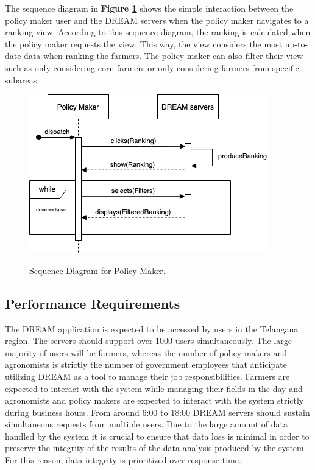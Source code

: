 \begin{flushleft}
The sequence diagram in \textbf{Figure \ref{fig:policySeqViewRank}} shows the simple interaction between the policy maker user and the DREAM servers when the policy maker navigates to a ranking view. According to this sequence diagram, the ranking is calculated when the policy maker requests the view. This way, the view considers the most up-to-date data when ranking the farmers. The policy maker can also filter their view such as only considering corn farmers or only considering farmers from specific subareas.
\end{flushleft}

\begin{figure}[hbt!]
\centering
\includegraphics[scale=0.6]{Files/sequence_disgrams/thePNGs/policy_viewRanking.png}\\
\caption{\label{fig:policySeqViewRank}Sequence Diagram for Policy Maker.}
\end{figure}



\newpage
\subsection{Performance Requirements}

\begin{flushleft}

The DREAM application is expected to be accessed by users in the Telangana region. The servers should support over 1000 users simultaneously. The large majority of users will be farmers, whereas the number of policy makers and agronomists is strictly the number of government employees that anticipate utilizing DREAM as a tool to manage their job responsibilities. Farmers are expected to interact with the system while managing their fields in the day and agronomists and policy makers are expected to interact with the system strictly during business hours. From around 6:00 to 18:00 DREAM servers should sustain simultaneous requests from multiple users. Due to the large amount of data handled by the system it is crucial to ensure that data loss is minimal in order to preserve the integrity of the results of the data analysis produced by the system. For this reason, data integrity is prioritized over response time.\\
\end{flushleft}

